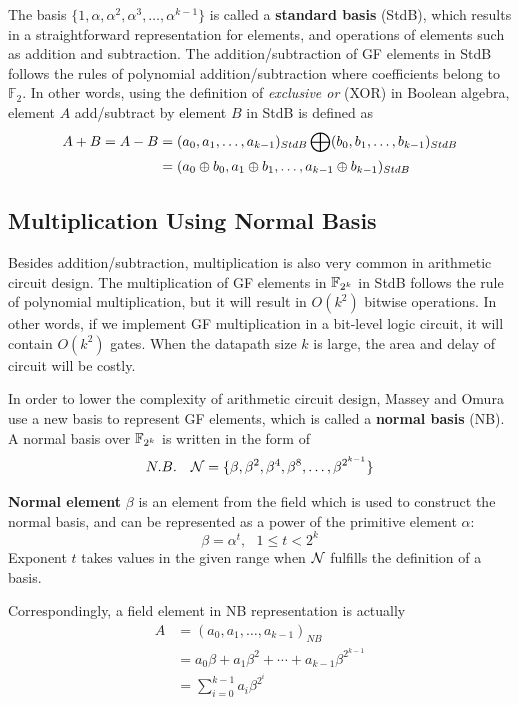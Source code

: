 The basis $\{1,\alpha,\alpha^2,\alpha^3,\dots,\alpha^{k-1}\}$ is called a {\bf standard basis} (StdB), which results in
a straightforward representation for elements, and operations of elements such as addition and subtraction.
The addition/subtraction of GF elements in StdB follows the rules of polynomial addition/subtraction
where coefficients belong to $\mathbb F_2$. In other words, using the definition of {\it exclusive or} (XOR) in
Boolean algebra, element $A$ add/subtract by element $B$ in StdB is defined as
\begin{align}\label{eqn:StdB}
A+B = A-B &= (a_0,a_1,\dots,a_{k-1})_{StdB} \bigoplus (b_0,b_1,\dots,b_{k-1})_{StdB} \nonumber\\
&=(a_0\oplus b_0, a_1\oplus b_1,\dots,a_{k-1}\oplus b_{k-1})_{StdB} 
\end{align}

\subsection{Multiplication Using Normal Basis}
Besides addition/subtraction, multiplication is also very common in arithmetic circuit design.
The multiplication of GF elements in ${\mathbb{F}}_{2^k}$ in StdB follows the rule of polynomial multiplication,
but it will result in $O(k^2)$ bitwise operations. In other words, if we implement GF multiplication
in a bit-level logic circuit, it will contain $O(k^2)$ gates. When the datapath size $k$ is large,
the area and delay of circuit will be costly.

In order to lower the complexity of arithmetic circuit design, Massey and Omura \cite{MasseyOmura} %
use a new basis to represent GF elements, which is called a {\bf normal basis} (NB).
A normal basis over ${\mathbb{F}}_{2^k}$ is written in the form of
\begin{equation*}
N.B. ~~~ {\mathcal{N}} = \{\beta,\beta^2,\beta^4,\beta^8,\dots,\beta^{2^{k-1}}\}
\end{equation*}

{\bf Normal element} $\beta$ is an element from the field which is used to construct the normal basis,
and can be represented as a power of the primitive element $\alpha$: 
\begin{equation*}
\beta = \alpha^t, ~~~ 1\leq t<2^k
\end{equation*}
Exponent $t$ takes values in the given range when ${\mathcal{N}}$ fulfills the definition of a basis.

Correspondingly, a field element in NB representation is actually
\begin{align*}
A &= (a_0,a_1,\dots,a_{k-1})_{NB} \\
  &= a_0\beta+a_1\beta^2+\cdots+a_{k-1}\beta^{2^{k-1}} \\
  &= \sum_{i=0}^{k-1} a_i\beta^{2^i}
\end{align*}

